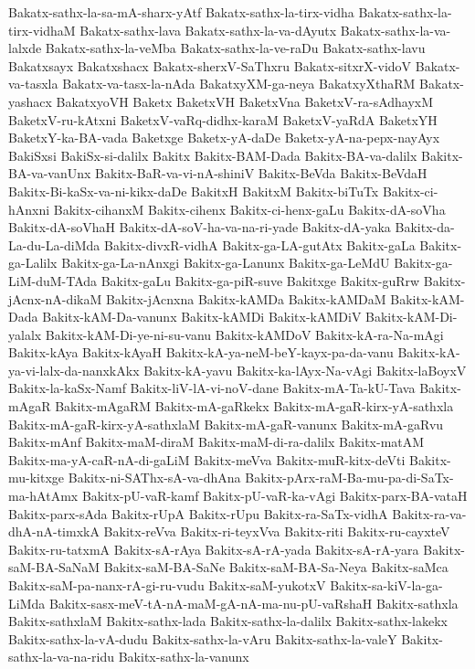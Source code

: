 {Bakatx-sathx-la-sa-mA-sharx-yAtf
Bakatx-sathx-la-tirx-vidha
Bakatx-sathx-la-tirx-vidhaM
Bakatx-sathx-lava
Bakatx-sathx-la-va-dAyutx
Bakatx-sathx-la-va-lalxde
Bakatx-sathx-la-veMba
Bakatx-sathx-la-ve-raDu
Bakatx-sathx-lavu
Bakatxsayx
Bakatxshacx
Bakatx-sherxV-SaThxru
Bakatx-sitxrX-vidoV
Bakatx-va-tasxla
Bakatx-va-tasx-la-nAda
BakatxyXM-ga-neya
BakatxyXthaRM
Bakatx-yashacx
BakatxyoVH
Baketx
BaketxVH
BaketxVna
BaketxV-ra-sAdhayxM
BaketxV-ru-kAtxni
BaketxV-vaRq-didhx-karaM
BaketxV-yaRdA
BaketxYH
BaketxY-ka-BA-vada
Baketxge
Baketx-yA-daDe
Baketx-yA-na-pepx-nayAyx
BakiSxsi
BakiSx-si-dalilx
Bakitx
Bakitx-BAM-Dada
Bakitx-BA-va-dalilx
Bakitx-BA-va-vanUnx
Bakitx-BaR-va-vi-nA-shiniV
Bakitx-BeVda
Bakitx-BeVdaH
Bakitx-Bi-kaSx-va-ni-kikx-daDe
BakitxH
BakitxM
Bakitx-biTuTx
Bakitx-ci-hAnxni
Bakitx-cihanxM
Bakitx-cihenx
Bakitx-ci-henx-gaLu
Bakitx-dA-soVha
Bakitx-dA-soVhaH
Bakitx-dA-soV-ha-va-na-ri-yade
Bakitx-dA-yaka
Bakitx-da-La-du-La-diMda
Bakitx-divxR-vidhA
Bakitx-ga-LA-gutAtx
Bakitx-gaLa
Bakitx-ga-Lalilx
Bakitx-ga-La-nAnxgi
Bakitx-ga-Lanunx
Bakitx-ga-LeMdU
Bakitx-ga-LiM-duM-TAda
Bakitx-gaLu
Bakitx-ga-piR-suve
Bakitxge
Bakitx-guRrw
Bakitx-jAcnx-nA-dikaM
Bakitx-jAcnxna
Bakitx-kAMDa
Bakitx-kAMDaM
Bakitx-kAM-Dada
Bakitx-kAM-Da-vanunx
Bakitx-kAMDi
Bakitx-kAMDiV
Bakitx-kAM-Di-yalalx
Bakitx-kAM-Di-ye-ni-su-vanu
Bakitx-kAMDoV
Bakitx-kA-ra-Na-mAgi
Bakitx-kAya
Bakitx-kAyaH
Bakitx-kA-ya-neM-beY-kayx-pa-da-vanu
Bakitx-kA-ya-vi-lalx-da-nanxkAkx
Bakitx-kA-yavu
Bakitx-ka-lAyx-Na-vAgi
Bakitx-laBoyxV
Bakitx-la-kaSx-Namf
Bakitx-liV-lA-vi-noV-dane
Bakitx-mA-Ta-kU-Tava
Bakitx-mAgaR
Bakitx-mAgaRM
Bakitx-mA-gaRkekx
Bakitx-mA-gaR-kirx-yA-sathxla
Bakitx-mA-gaR-kirx-yA-sathxlaM
Bakitx-mA-gaR-vanunx
Bakitx-mA-gaRvu
Bakitx-mAnf
Bakitx-maM-diraM
Bakitx-maM-di-ra-dalilx
Bakitx-matAM
Bakitx-ma-yA-caR-nA-di-gaLiM
Bakitx-meVva
Bakitx-muR-kitx-deVti
Bakitx-mu-kitxge
Bakitx-ni-SAThx-sA-va-dhAna
Bakitx-pArx-raM-Ba-mu-pa-di-SaTx-ma-hAtAmx
Bakitx-pU-vaR-kamf
Bakitx-pU-vaR-ka-vAgi
Bakitx-parx-BA-vataH
Bakitx-parx-sAda
Bakitx-rUpA
Bakitx-rUpu
Bakitx-ra-SaTx-vidhA
Bakitx-ra-va-dhA-nA-timxkA
Bakitx-reVva
Bakitx-ri-teyxVva
Bakitx-riti
Bakitx-ru-cayxteV
Bakitx-ru-tatxmA
Bakitx-sA-rAya
Bakitx-sA-rA-yada
Bakitx-sA-rA-yara
Bakitx-saM-BA-SaNaM
Bakitx-saM-BA-SaNe
Bakitx-saM-BA-Sa-Neya
Bakitx-saMca
Bakitx-saM-pa-nanx-rA-gi-ru-vudu
Bakitx-saM-yukotxV
Bakitx-sa-kiV-la-ga-LiMda
Bakitx-sasx-meV-tA-nA-maM-gA-nA-ma-nu-pU-vaRshaH
Bakitx-sathxla
Bakitx-sathxlaM
Bakitx-sathx-lada
Bakitx-sathx-la-dalilx
Bakitx-sathx-lakekx
Bakitx-sathx-la-vA-dudu
Bakitx-sathx-la-vAru
Bakitx-sathx-la-valeY
Bakitx-sathx-la-va-na-ridu
Bakitx-sathx-la-vanunx
}
